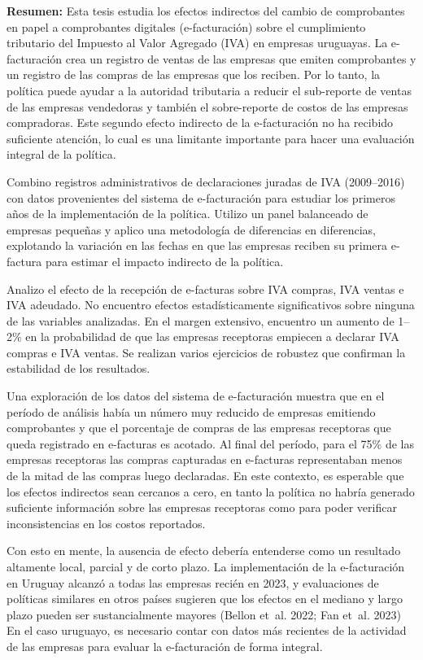 \textbf{Resumen:} Esta tesis estudia los efectos indirectos del cambio de comprobantes en papel a comprobantes digitales (e-facturación) sobre el cumplimiento tributario del Impuesto al Valor Agregado (IVA) en empresas uruguayas. La e-facturación crea un registro de ventas de las empresas que emiten comprobantes y un registro de las compras de las empresas que los reciben. Por lo tanto, la política puede ayudar a la autoridad tributaria a reducir el sub-reporte de ventas de las empresas vendedoras y también el sobre-reporte de costos de las empresas compradoras. Este segundo efecto indirecto de la e-facturación no ha recibido suficiente atención, lo cual es una limitante importante para hacer una evaluación integral de la política.

Combino registros administrativos de declaraciones juradas de IVA (2009–2016) con datos provenientes del sistema de e-facturación para estudiar los primeros años de la implementación de la política. Utilizo un panel balanceado de empresas pequeñas y aplico una metodología de diferencias en diferencias, explotando la variación en las fechas en que las empresas reciben su primera e-factura para estimar el impacto indirecto de la política. 

Analizo el efecto de la recepción de e-facturas sobre IVA compras, IVA ventas e IVA adeudado. No encuentro efectos estadísticamente significativos sobre ninguna de las variables analizadas. En el margen extensivo, encuentro un aumento de 1–2\% en la probabilidad de que las empresas receptoras empiecen a declarar IVA compras e IVA ventas. Se realizan varios ejercicios de robustez que confirman la estabilidad de los resultados. 

Una exploración de los datos del sistema de e-facturación muestra que en el período de análisis había un número muy reducido de empresas emitiendo comprobantes y que el porcentaje de compras de las empresas receptoras que queda registrado en e-facturas es acotado. Al final del período, para el 75\% de las empresas receptoras las compras capturadas en e-facturas representaban menos de la mitad de las compras luego declaradas. En este contexto, es esperable que los efectos indirectos sean cercanos a cero, en tanto la política no habría generado suficiente información sobre las empresas receptoras como para poder verificar inconsistencias en los costos reportados.

Con esto en mente, la ausencia de efecto debería entenderse como un resultado altamente local, parcial y de corto plazo. La implementación de la e-facturación en Uruguay alcanzó a todas las empresas recién en 2023, y evaluaciones de políticas similares en otros países sugieren que los efectos en el mediano y largo plazo pueden ser sustancialmente mayores (Bellon et~al. 2022; Fan et~al. 2023) En el caso uruguayo, es necesario contar con datos más recientes de la actividad de las empresas para evaluar la e-facturación de forma integral.

